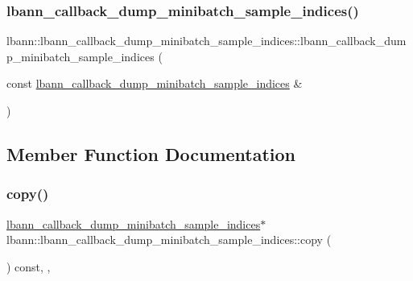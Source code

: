 \subsubsection{\texorpdfstring{lbann\+\_\+callback\+\_\+dump\+\_\+minibatch\+\_\+sample\+\_\+indices()}{lbann\_callback\_dump\_minibatch\_sample\_indices()}\hspace{0.1cm}{\footnotesize\ttfamily [2/2]}}
{\footnotesize\ttfamily lbann\+::lbann\+\_\+callback\+\_\+dump\+\_\+minibatch\+\_\+sample\+\_\+indices\+::lbann\+\_\+callback\+\_\+dump\+\_\+minibatch\+\_\+sample\+\_\+indices (\begin{DoxyParamCaption}\item[{const \hyperlink{classlbann_1_1lbann__callback__dump__minibatch__sample__indices}{lbann\+\_\+callback\+\_\+dump\+\_\+minibatch\+\_\+sample\+\_\+indices} \&}]{ }\end{DoxyParamCaption})\hspace{0.3cm}{\ttfamily [default]}}



\subsection{Member Function Documentation}
\mbox{\label{classlbann_1_1lbann__callback__dump__minibatch__sample__indices_a6847ea742037dbe5f4ee6d2b4b4307a4}} 
\subsubsection{\texorpdfstring{copy()}{copy()}}
{\footnotesize\ttfamily \hyperlink{classlbann_1_1lbann__callback__dump__minibatch__sample__indices}{lbann\+\_\+callback\+\_\+dump\+\_\+minibatch\+\_\+sample\+\_\+indices}$\ast$ lbann\+::lbann\+\_\+callback\+\_\+dump\+\_\+minibatch\+\_\+sample\+\_\+indices\+::copy (\begin{DoxyParamCaption}{ }\end{DoxyParamCaption}) const\hspace{0.3cm}{\ttfamily [inline]}, {\ttfamily [override]}, {\ttfamily [virtual]}}



